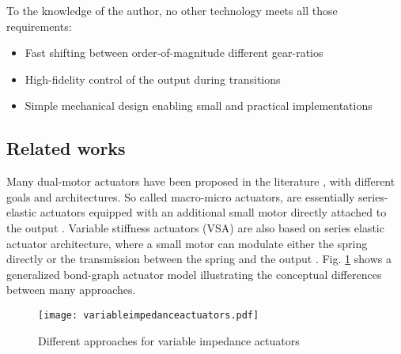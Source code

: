To the knowledge of the author, no other technology meets all those requirements:
\begin{itemize}
	\item Fast shifting between order-of-magnitude different gear-ratios
	\item High-fidelity control of the output during transitions
	\item Simple mechanical design enabling small and practical implementations
\end{itemize}

\subsection{Related works}
Many dual-motor actuators have been proposed in the literature \cite{tagliamonte_double_2012}, with different goals and architectures. So called macro-micro actuators, are essentially series-elastic actuators equipped with an additional small motor directly attached to the output \cite{morrell_parallel-coupled_1998}. Variable stiffness actuators (VSA) are also based on series elastic actuator architecture, where a small motor can modulate either the spring directly or the transmission between the spring and the output \cite{jafari_new_2014}. Fig. \ref{fig:variableimpedanceactuators} shows a generalized bond-graph actuator model illustrating the conceptual differences between many approaches. 

\begin{figure}[hb]
	\centering
		\texttt{[image: variableimpedanceactuators.pdf]}
	\caption{Different approaches for variable impedance actuators}
	\label{fig:variableimpedanceactuators}
\end{figure}

